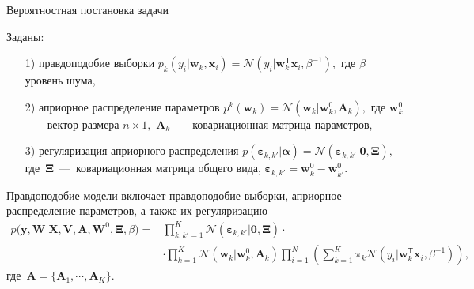 \documentclass[10pt,pdf,hyperref={unicode}]{beamer}
\begin{document}

\begin{frame}{Вероятностная постановка задачи}
\justifying

Заданы:
\begin{enumerate}
	\item[1)] правдоподобие выборки $p_{k}\left(y_{i}|\mathbf{w}_{k}, \mathbf{x}_{i}\right) = \mathcal{N}\left(y_{i}|\mathbf{w}_{k}^{\mathsf{T}}\mathbf{x}_{i}, \beta^{-1}\right),$ где $\beta$ уровень шума,
	\item[2)] априорное распределение параметров $p^{k}\left(\mathbf{w}_{k}\right) = \mathcal{N}\left(\mathbf{w}_{k}|\mathbf{w}^{0}_{k}, \mathbf{A}_{k}\right),$ где $\mathbf{w}^{0}_{k}$~---~вектор размера $n\times1,$ $\mathbf{A}_{k}$~---~ковариационная матрица параметров,
	\item[3)] регуляризация априорного распределения $p\left(\bm{\varepsilon}_{k,k'}|\bm{\alpha}\right) = \mathcal{N}\left(\bm{\varepsilon}_{k,k'}|\mathbf{0},  \bm{\Xi}\right),$ где~$\bm{\Xi}$~---~ковариационная матрица общего вида, $\bm{\varepsilon}_{k,k'} = \mathbf{w}_{k}^{0}-\mathbf{w}_{k'}^{0}.$
\end{enumerate}

Правдоподобие модели включает правдоподобие выборки, априорное распределение параметров, а также их регуляризацию
\[
\begin{aligned}
p\bigr(\mathbf{y}, \mathbf{W}|\mathbf{X}, \mathbf{V}, \textbf{A}, \textbf{W}^{0}, \bm{\Xi}, \beta\bigr) = &\prod_{k,k'=1}^{K}\mathcal{N}\left(\bm{\varepsilon}_{k,k'}|\mathbf{0},  \bm{\Xi}\right)\cdot\\
&\cdot\prod_{k=1}^{K}\mathcal{N}\left(\mathbf{w}_{k}|\mathbf{w}^{0}_{k}, \mathbf{A}_{k}\right)\prod_{i=1}^{N}\left(\sum_{k=1}^{K}\pi_{k}\mathcal{N}\left(y_{i}|\mathbf{w}_{k}^{\mathsf{T}}\mathbf{x}_{i}, \beta^{-1}\right)\right),
\end{aligned}
\]
где~$\mathbf{A} = \bigr\{\mathbf{A}_1, \cdots, \mathbf{A}_K\bigr\}.$

\end{frame}

\end{document}
